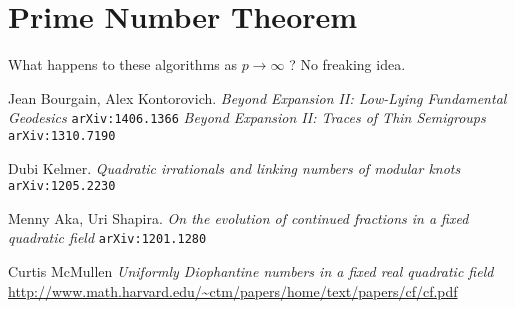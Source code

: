 \documentclass[12pt]{article}
\begin{document}
{\section{Prime Number Theorem}

What happens to these algorithms as $p \to \infty$ ? No freaking idea.



\begin{thebibliography}{9}

Jean Bourgain, Alex Kontorovich. \newline \textit{Beyond Expansion II: Low-Lying Fundamental Geodesics}   \texttt{arXiv:1406.1366} \newline
\textit{Beyond Expansion II: Traces of Thin Semigroups} \texttt{arXiv:1310.7190}

Dubi Kelmer. \textit{Quadratic irrationals and linking numbers of modular knots}  \texttt{arXiv:1205.2230}
 
Menny Aka, Uri Shapira. \textit{On the evolution of continued fractions in a fixed quadratic field}  \texttt{arXiv:1201.1280}

Curtis McMullen \textit{Uniformly Diophantine numbers in a fixed real quadratic field } \url{http://www.math.harvard.edu/~ctm/papers/home/text/papers/cf/cf.pdf}

\end{thebibliography}
}
\end{document}
